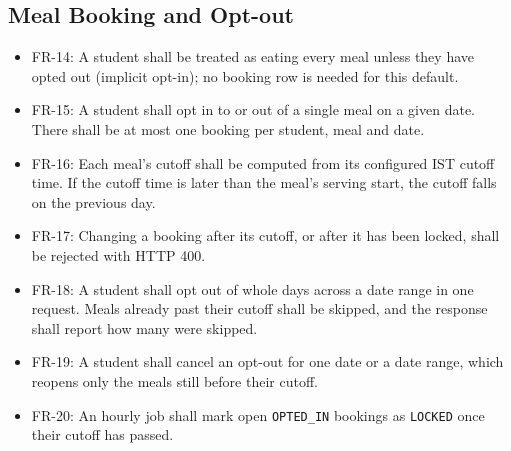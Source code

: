 \documentclass{scrreprt}
\begin{document}
\subsection{Meal Booking and Opt-out}
\begin{itemize}
    \item FR-14: A student shall be treated as eating every meal unless they
    have opted out (implicit opt-in); no booking row is needed for this
    default.
    \item FR-15: A student shall opt in to or out of a single meal on a given
    date. There shall be at most one booking per student, meal and date.
    \item FR-16: Each meal's cutoff shall be computed from its configured IST
    cutoff time. If the cutoff time is later than the meal's serving start,
    the cutoff falls on the previous day.
    \item FR-17: Changing a booking after its cutoff, or after it has been
    locked, shall be rejected with HTTP 400.
    \item FR-18: A student shall opt out of whole days across a date range in
    one request. Meals already past their cutoff shall be skipped, and the
    response shall report how many were skipped.
    \item FR-19: A student shall cancel an opt-out for one date or a date
    range, which reopens only the meals still before their cutoff.
    \item FR-20: An hourly job shall mark open \texttt{OPTED\_IN} bookings
    as \texttt{LOCKED} once their cutoff has passed.
\end{itemize}
\end{document}

